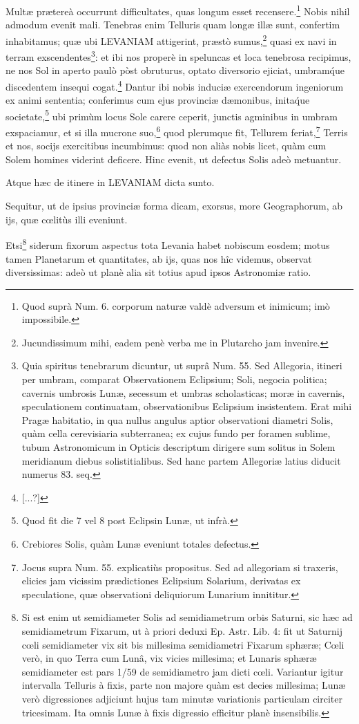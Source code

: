 \documentclass[a4paper, 11pt, oneside, polutonikogreek, german]{article}
\begin{document}
Multæ prætereà occurrunt difficultates, quas longum esset recensere.\footnote{Quod suprà Num. 6. corporum naturæ valdè adversum et inimicum; imò impossibile.} Nobis nihil admodum evenit mali. Tenebras enim Telluris quam longæ illæ sunt, confertim inhabitamus; quæ ubi LEVANIAM attigerint, præstò sumus,\footnote{Jucundissimum mihi, eadem penè verba me in Plutarcho jam invenire.} quasi ex navi in terram exscendentes\footnote{Quia spiritus tenebrarum dicuntur, ut suprâ Num. 55. Sed Allegoria, itineri per umbram, comparat Observationem Eclipsium; Soli, negocia politica; cavernis umbrosis Lunæ, secessum et umbras scholasticas; moræ in cavernis, speculationem continuatam, observationibus Eclipsium insistentem. Erat mihi Pragæ habitatio, in qua nullus angulus aptior observationi diametri Solis, quàm cella cerevisiaria subterranea; ex cujus fundo per foramen sublime, tubum Astronomicum in Opticis descriptum dirigere sum solitus in Solem meridianum diebus solistitialibus. Sed hanc partem Allegoriæ latius diducit numerus 83. seq.}: et ibi nos properè in speluncas et loca tenebrosa recipimus, ne nos Sol in aperto paulò pòst obruturus, optato diversorio ejiciat, umbram\'que discedentem insequi cogat.\footnote{[...?]} Dantur ibi nobis induciæ exercendorum ingeniorum ex animi sententia; conferimus cum ejus provinciæ dæmonibus, inita\'que societate,\footnote{Quod fit die 7 vel 8 post Eclipsin Lunæ, ut infrà.} ubi primùm locus Sole carere ceperit, junctis agminibus in umbram exspaciamur, et si illa mucrone suo,\footnote{Crebiores Solis, quàm Lunæ eveniunt totales defectus.} quod plerumque fit, Tellurem feriat,\footnote{Jocus supra Num. 55. explicatiùs propositus. Sed ad allegoriam si traxeris, elicies jam vicissim prædictiones Eclipsium Solarium, derivatas ex speculatione, quæ observationi deliquiorum Lunarium innititur.} Terris et nos, socijs exercitibus incumbimus: quod non aliàs nobis licet, quàm cum Solem homines viderint deficere. Hinc evenit, ut defectus Solis adeò metuantur.

Atque hæc de itinere in LEVANIAM dicta sunto.

Sequitur, ut de ipsius provinciæ forma dicam, exorsus, more Geographorum, ab ijs, quæ cœlitùs illi eveniunt.

Etsi\footnote{Si est enim ut semidiameter Solis ad semidiametrum orbis Saturni, sic hæc ad semidiametrum Fixarum, ut à priori deduxi Ep. Astr. Lib. 4: fit ut Saturnij cœli semidiameter vix sit bis millesima semidiametri Fixarum sphæræ; Cœli verò, in quo Terra cum Lunâ, vix vicies millesima; et Lunaris sphæræ semidiameter est pars 1/59 de semidiametro jam dicti cœli. Variantur igitur intervalla Telluris à fixis, parte non majore quàm est decies millesima; Lunæ verò digressiones adjiciunt hujus tam minutæ variationis particulam circiter tricesimam. Ita omnis Lunæ à fixis digressio efficitur planè insensibilis.} siderum fixorum aspectus tota Levania habet nobiscum eosdem; motus tamen Planetarum et quantitates, ab ijs, quas nos hîc videmus, observat diversissimas: adeò ut planè alia sit totius apud ipsos Astronomiæ ratio.
\end{document}
